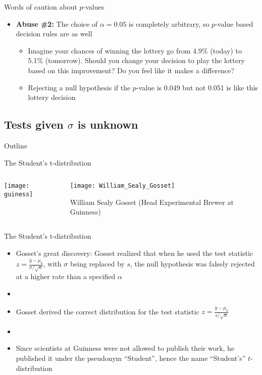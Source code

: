 \documentclass[xcolor=dvipsnames]{beamer}
\begin{document}
\begin{frame}{Words of caution about $p$-values}
	\begin{itemize}
		\item \textbf{Abuse \#2:} The choice of $\alpha = 0.05$ is completely arbitrary, so $p$-value based decision rules are as well  \pause
		\begin{itemize}
			\item Imagine your chances of winning the lottery go from 4.9\% (today) to 5.1\% (tomorrow). Should you change your decision to play the lottery based on this improvement? Do you feel like it makes a difference?  \pause
			\item Rejecting a null hypothesis if the $p$-value is 0.049 but not 0.051 is like this lottery decision
		\end{itemize}
	\end{itemize}
\end{frame}

\subsection{Tests given $\sigma$ is unknown}
\begin{frame}{Outline}
\tableofcontents[currentsection,subsectionstyle=show/shaded/hide]
\end{frame}

\begin{frame}{The Student's t-distribution}
\begin{columns}
	\begin{column}{.5 \textwidth}
		\texttt{[image: guiness]}
	\end{column}
	\begin{column}{.5 \textwidth}
		\texttt{[image: William\_Sealy\_Gosset]}
		
		William Sealy Gosset (Head Experimental Brewer at Guinness)
	\end{column}
\end{columns}
\end{frame}

\begin{frame}{The Student's t-distribution}
	\begin{itemize}
		\item Gosset's great discovery: Gosset realized that when he used the test statistic $z = \frac{\bar{y}-\mu_0}{\sigma / \sqrt{n}}$, with $\sigma$ being replaced by $s$, the null hypothesis was falsely rejected at a higher rate than a specified $\alpha$  \pause
		\item[]
		\item Gosset derived the correct distribution for the test statistic $z = \frac{\bar{y}-\mu_0}{s / \sqrt{n}}$  \pause
		\item[]
		\item Since scientists at Guinness were not allowed to publish their work, he published it under the pseudonym ``Student'', hence the name ``Student's'' $t$-distribution
	\end{itemize}
\end{frame}
\end{document}
